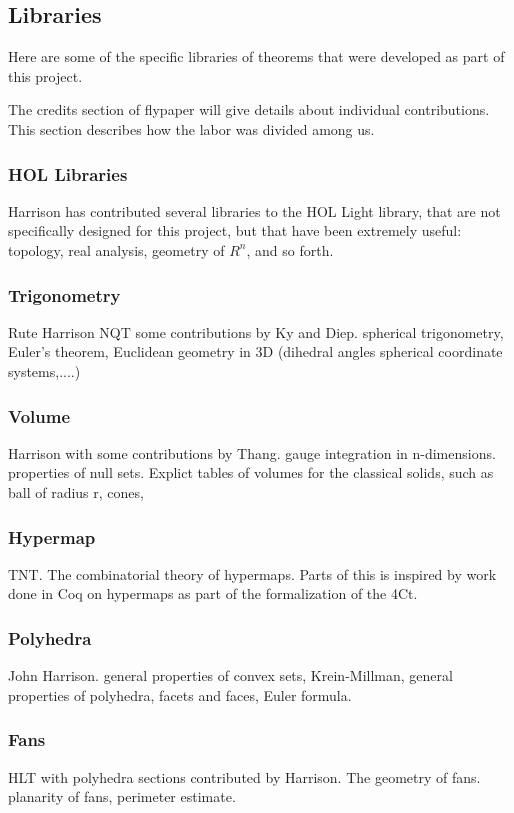 \documentclass{llncs}
\begin{document}
\subsection{Libraries}

Here are some of the specific libraries of theorems that were developed as part
of this project.

The credits section of flypaper will give details about individual contributions.
This section describes how the labor was divided among us.


\subsubsection{HOL Libraries} 
Harrison has contributed several libraries to the HOL Light library,
that are not specifically designed for this project, but that have been extremely
useful: topology, real analysis, geometry of $R^n$, and so forth.

\subsubsection{Trigonometry} 
Rute Harrison NQT some contributions by Ky and Diep.
spherical trigonometry, Euler's theorem, Euclidean geometry in 3D (dihedral
angles spherical coordinate systems,....)

\subsubsection{Volume} Harrison with some contributions by Thang.
gauge integration in n-dimensions.  properties of null sets.  Explict tables of
volumes for the classical solids, such as ball of radius r, cones, 

\subsubsection{Hypermap}  TNT.  The combinatorial theory of hypermaps.  Parts of this
is inspired by work done in Coq on hypermaps as part of the formalization 
of the 4Ct.


\subsubsection{Polyhedra} John Harrison.  general properties of convex sets,
Krein-Millman, general properties of polyhedra, facets and faces,
Euler formula.

\subsubsection{Fans}  HLT with polyhedra sections contributed by Harrison.  The geometry of fans.
planarity of fans,
perimeter estimate.
\end{document}
